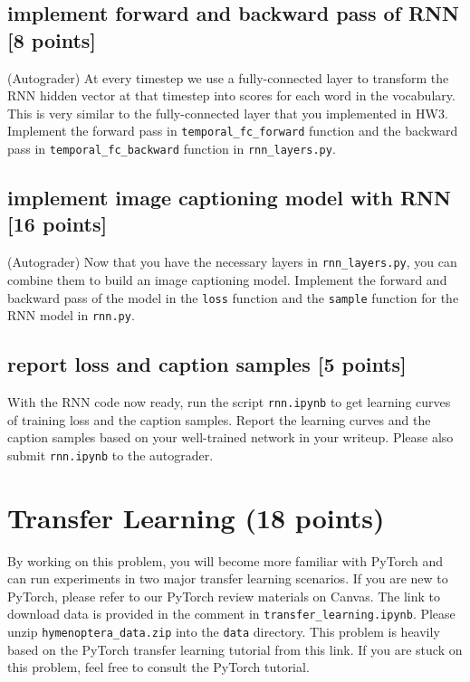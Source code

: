 \documentclass[lang=cn,11pt]{elegantbook}
\begin{document}
\subsection{implement forward and backward pass of RNN [8 points]}
(Autograder) At every timestep we use a fully-connected layer to transform the RNN hidden vector at that timestep into scores for each word in the vocabulary. This is very similar to the fully-connected layer that you implemented in HW3. Implement the forward pass in \texttt{temporal\_fc\_forward} function and the backward pass in \texttt{temporal\_fc\_backward} function in \texttt{rnn\_layers.py}.







\subsection{implement image captioning model with RNN [16 points]}
 (Autograder) Now that you have the necessary layers in \texttt{rnn\_layers.py}, you can combine them to build an image captioning model. Implement the forward and backward pass of the model in the \texttt{loss} function and the \texttt{sample} function for the RNN model in \texttt{rnn.py}.

\subsection*{report loss and caption samples [5 points]}
With the RNN code now ready, run the script \texttt{rnn.ipynb} to get learning curves of training loss and the caption samples. Report the learning curves and the caption samples based on your well-trained network in your writeup. Please also submit \texttt{rnn.ipynb} to the autograder.


\section{Transfer Learning (18 points)}
By working on this problem, you will become more familiar with PyTorch and can run experiments in two major transfer learning scenarios. If you are new to PyTorch, please refer to our PyTorch review materials on Canvas. The link to download data is provided in the comment in \texttt{transfer\_learning.ipynb}. Please unzip \texttt{hymenoptera\_data.zip} into the \texttt{data} directory.
This problem is heavily based on the PyTorch transfer learning tutorial from this link. If you are stuck on this problem, feel free to consult the PyTorch tutorial.
\end{document}
